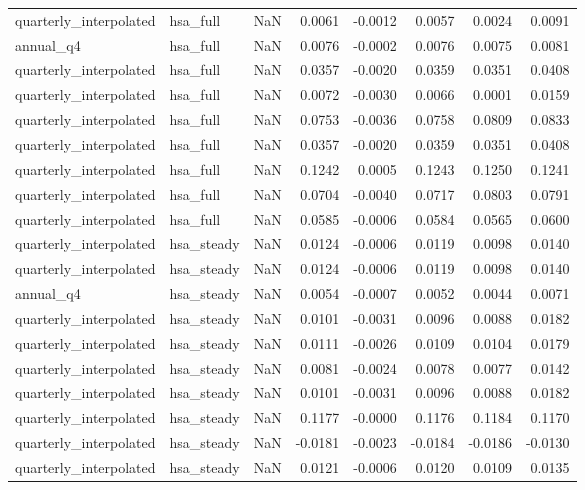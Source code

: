 \begin{tabular}{llrrrrrr}
quarterly\_interpolated & hsa\_full & NaN & 0.0061 & -0.0012 & 0.0057 & 0.0024 & 0.0091 \\
annual\_q4 & hsa\_full & NaN & 0.0076 & -0.0002 & 0.0076 & 0.0075 & 0.0081 \\
quarterly\_interpolated & hsa\_full & NaN & 0.0357 & -0.0020 & 0.0359 & 0.0351 & 0.0408 \\
quarterly\_interpolated & hsa\_full & NaN & 0.0072 & -0.0030 & 0.0066 & 0.0001 & 0.0159 \\
quarterly\_interpolated & hsa\_full & NaN & 0.0753 & -0.0036 & 0.0758 & 0.0809 & 0.0833 \\
quarterly\_interpolated & hsa\_full & NaN & 0.0357 & -0.0020 & 0.0359 & 0.0351 & 0.0408 \\
quarterly\_interpolated & hsa\_full & NaN & 0.1242 & 0.0005 & 0.1243 & 0.1250 & 0.1241 \\
quarterly\_interpolated & hsa\_full & NaN & 0.0704 & -0.0040 & 0.0717 & 0.0803 & 0.0791 \\
quarterly\_interpolated & hsa\_full & NaN & 0.0585 & -0.0006 & 0.0584 & 0.0565 & 0.0600 \\
quarterly\_interpolated & hsa\_steady & NaN & 0.0124 & -0.0006 & 0.0119 & 0.0098 & 0.0140 \\
quarterly\_interpolated & hsa\_steady & NaN & 0.0124 & -0.0006 & 0.0119 & 0.0098 & 0.0140 \\
annual\_q4 & hsa\_steady & NaN & 0.0054 & -0.0007 & 0.0052 & 0.0044 & 0.0071 \\
quarterly\_interpolated & hsa\_steady & NaN & 0.0101 & -0.0031 & 0.0096 & 0.0088 & 0.0182 \\
quarterly\_interpolated & hsa\_steady & NaN & 0.0111 & -0.0026 & 0.0109 & 0.0104 & 0.0179 \\
quarterly\_interpolated & hsa\_steady & NaN & 0.0081 & -0.0024 & 0.0078 & 0.0077 & 0.0142 \\
quarterly\_interpolated & hsa\_steady & NaN & 0.0101 & -0.0031 & 0.0096 & 0.0088 & 0.0182 \\
quarterly\_interpolated & hsa\_steady & NaN & 0.1177 & -0.0000 & 0.1176 & 0.1184 & 0.1170 \\
quarterly\_interpolated & hsa\_steady & NaN & -0.0181 & -0.0023 & -0.0184 & -0.0186 & -0.0130 \\
quarterly\_interpolated & hsa\_steady & NaN & 0.0121 & -0.0006 & 0.0120 & 0.0109 & 0.0135 \\
\bottomrule
\end{tabular}
